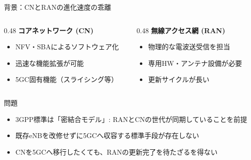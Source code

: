 \documentclass[dvipdfmx,11pt,aspectratio=169]{beamer}
\begin{document}
\begin{frame}{背景：CNとRANの進化速度の乖離}
  \begin{columns}[T]
    \begin{column}{0.48\textwidth}
      \textbf{コアネットワーク (CN)}
      \begin{itemize}
        \item NFV・SBAによるソフトウェア化
        \item 迅速な機能拡張が可能
        \item 5GC固有機能（スライシング等）
      \end{itemize}
    \end{column}
    \begin{column}{0.48\textwidth}
      \textbf{無線アクセス網 (RAN)}
      \begin{itemize}
        \item 物理的な電波送受信を担当
        \item 専用HW・アンテナ設備が必要
        \item 更新サイクルが長い
      \end{itemize}
    \end{column}
  \end{columns}

  \vspace{0.5cm}
  \begin{block}{問題}
    \begin{itemize}
      \item 3GPP標準は「\alert{密結合モデル}」: RANとCNの世代が同期していることを前提
      \item 既存eNBを改修せずに5GCへ収容する\alert{標準手段が存在しない}
      \item CNを5GCへ移行したくても、RANの更新完了を待たざるを得ない
    \end{itemize}
  \end{block}
\end{frame}
\end{document}

